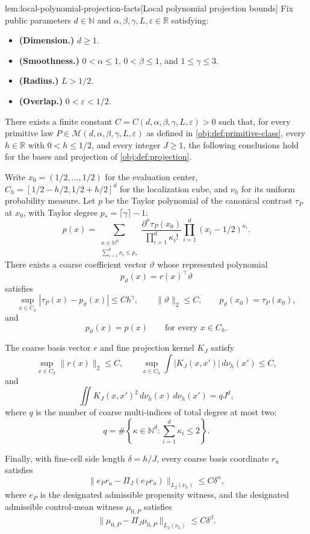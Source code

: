 \begin{lemmav}{lem:local-polynomial-projection-facts}[Local polynomial projection bounds]
Fix public parameters \(d\in\mathbb N\) and \(\alpha,\beta,\gamma,L,\varepsilon\in\mathbb R\) satisfying:
\begin{itemize}
\item \textbf{(Dimension.)} \(d\ge1\).
\item \textbf{(Smoothness.)} \(0<\alpha\le1\), \(0<\beta\le1\), and \(1\le\gamma\le3\).
\item \textbf{(Radius.)} \(L>1/2\).
\item \textbf{(Overlap.)} \(0<\varepsilon<1/2\).
\end{itemize}
There exists a finite constant \(C=C(d,\alpha,\beta,\gamma,L,\varepsilon)>0\) such that, for every primitive law \(P\in\mathcal M(d,\alpha,\beta,\gamma,L,\varepsilon)\) as defined in \cref{obj:def:primitive-class}, every \(h\in\mathbb R\) with \(0<h\le1/2\), and every integer \(J\ge1\), the following conclusions hold for the bases and projection of \cref{obj:def:projection}.

Write \(x_0=(1/2,\ldots,1/2)\) for the evaluation center, \(C_h=[1/2-h/2,1/2+h/2]^d\) for the localization cube, and \(\nu_h\) for its uniform probability measure. Let \(p\) be the Taylor polynomial of the canonical contrast \(\tau_P\) at \(x_0\), with Taylor degree \(p_*=\lceil\gamma\rceil-1\):
\[
p(x)=
\sum_{\substack{\kappa\in\mathbb N^d\\ \sum_{i=1}^d\kappa_i\le p_*}}
\frac{\partial^\kappa\tau_P(x_0)}
     {\prod_{i=1}^d\kappa_i!}
\prod_{i=1}^d(x_i-1/2)^{\kappa_i}.
\]
There exists a coarse coefficient vector \(\vartheta\) whose represented polynomial
\[
p_\vartheta(x)=r(x)^\top\vartheta
\]
satisfies
\[
\sup_{x\in C_h}|\tau_P(x)-p_\vartheta(x)|\le Ch^\gamma,
\qquad
\|\vartheta\|_2\le C,
\qquad
p_\vartheta(x_0)=\tau_P(x_0),
\]
and
\[
p_\vartheta(x)=p(x)\qquad\text{for every }x\in C_h.
\]

The coarse basis vector \(r\) and fine projection kernel \(K_J\) satisfy
\[
\sup_{x\in C_h}\|r(x)\|_2\le C,
\qquad
\sup_{x\in C_h}\int |K_J(x,x')|\,d\nu_h(x')\le C,
\]
and
\[
\iint K_J(x,x')^2\,d\nu_h(x)\,d\nu_h(x')
=qJ^d,
\]
where \(q\) is the number of coarse multi-indices of total degree at most two:
\[
q=\#\left\{\kappa\in\mathbb N^d:\sum_{i=1}^d\kappa_i\le2\right\}.
\]

Finally, with fine-cell side length \(\delta=h/J\), every coarse basis coordinate \(r_u\) satisfies
\[
\|e_Pr_u-\Pi_J(e_Pr_u)\|_{L_2(\nu_h)}
\le C\delta^\alpha,
\]
where \(e_P\) is the designated admissible propensity witness, and the designated admissible control-mean witness \(\mu_{0,P}\) satisfies
\[
\|\mu_{0,P}-\Pi_J\mu_{0,P}\|_{L_2(\nu_h)}
\le C\delta^\beta.
\]
\end{lemmav}

